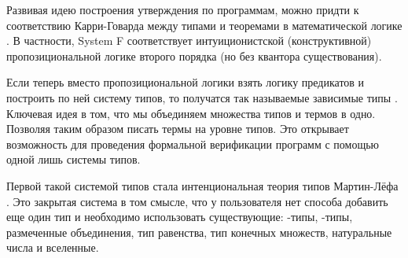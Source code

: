 Развивая идею построения утверждения по программам, можно придти к соответствию Карри-Говарда
между типами и теоремами в математической логике \cite{propositions-as-types}. В частности, System F
соответствует интуиционистской (конструктивной) пропозициональной логике второго порядка
(но без квантора существования).

Если теперь вместо пропозициональной логики взять логику предикатов и построить по ней систему типов,
то получатся так называемые зависимые типы \cite{intuitionistic-theory-of-types}.
Ключевая идея в том, что мы объединяем множества типов и термов в одно. Позволяя таким образом писать
термы на уровне типов. Это открывает возможность для проведения формальной верификации программ с
помощью одной лишь системы типов.

Первой такой системой типов стала интенциональная теория типов Мартин-Лёфа
\cite{intuitionistic-theory-of-types}. Это закрытая система в том смысле,
что у пользователя нет способа добавить еще один тип и необходимо использовать
существующие: \textPi-типы, \textSigma-типы, размеченные объединения, тип равенства,
тип конечных множеств, натуральные числа и вселенные.
